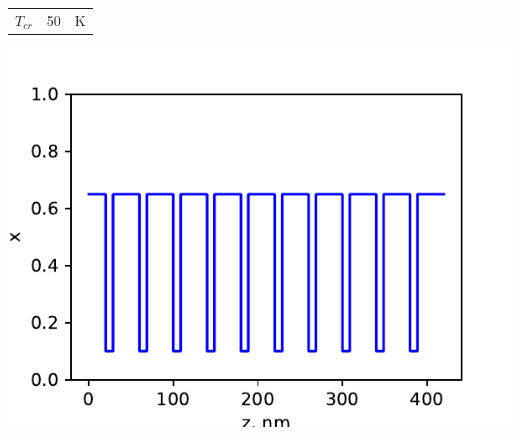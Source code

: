 \documentclass[9pt,pdf]{beamer}
\begin{document}
\begin{frame}
\begin{columns}
\begin{column}{0.3\textwidth}
\begin{center}
\begin{tabular}{c | c c}
                        $T_{cr}$       & 50 & K
                    \end{tabular}
                \end{center}
                \begin{center}
                    \includegraphics[width=1.2\textwidth]{images/xz170130.pdf}
                \end{center}
            \end{column}
        \end{columns}
    \end{frame}
\end{document}
